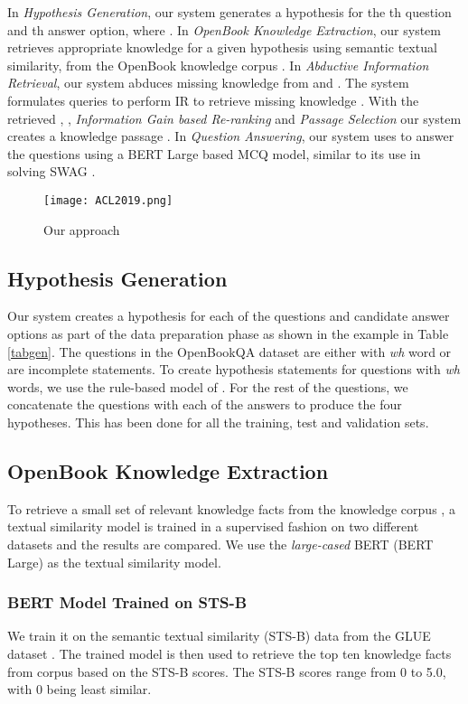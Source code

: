 \documentclass[11pt,a4paper]{article}
\begin{document}
In \textit{Hypothesis Generation}, our system generates a hypothesis  for the th question and th answer option, where . In \textit{OpenBook Knowledge Extraction}, our system retrieves appropriate knowledge  for a given hypothesis  using semantic textual similarity, from the OpenBook knowledge corpus . In \textit{Abductive Information Retrieval}, our system abduces missing knowledge from  and . The system formulates queries to perform IR to retrieve missing knowledge .  With the retrieved , , \textit{Information Gain based Re-ranking} and \textit{Passage Selection} our system creates a knowledge passage . In \textit{Question Answering}, our system uses  to answer the questions using a BERT Large based MCQ model, similar to its use in solving SWAG \cite{zellers2018swag}. 
  
 

\begin{figure}
  \texttt{[image: ACL2019.png]}
  \caption{Our approach}
  \label{fig:blk}
\end{figure}

 




\subsection{Hypothesis Generation}
Our system creates a hypothesis for each of the questions and candidate answer options as part of the data preparation phase as shown in the example in Table \ref{tabgen}. The questions in the OpenBookQA
dataset are either with \textit{wh} word or are incomplete statements.
To create hypothesis statements for questions with \textit{wh} words, we use the rule-based model of \citet{demszky2018transforming}. For the rest of the questions, we concatenate the questions with each of the answers to produce the four hypotheses. This has been done for all the training, test and validation sets. 
\subsection{OpenBook Knowledge Extraction}
To retrieve a small set of relevant knowledge facts from the knowledge corpus , a textual similarity model is trained in a supervised fashion on two different datasets and the results are compared. We use the \textit{large-cased} BERT \cite{devlin2018bert} (BERT Large) as the textual similarity model. 
\subsubsection{BERT Model Trained on STS-B}
\label{sts}
We train it on the semantic textual similarity (STS-B) data from the GLUE dataset \cite{wang2018glue}. The trained model is then used to retrieve the top ten knowledge facts from corpus  based on the STS-B scores. The STS-B scores range from 0 to 5.0, with 0 being least similar.
\end{document}
